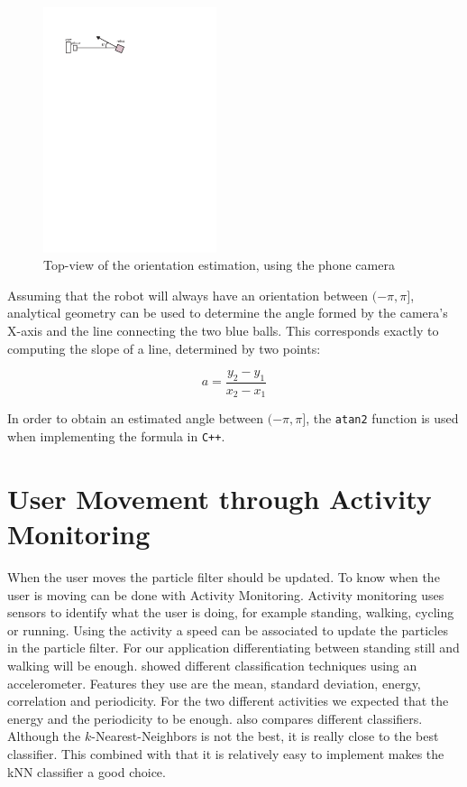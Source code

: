 \documentclass[journal]{IEEEtran}
\let\MYoriglatexcaption\caption
\renewcommand{\caption}[2][\relax]{\MYoriglatexcaption[#2]{#2}}
\begin{document}
\begin{figure}[!htpb]
\centering
\includegraphics[width=2in]{images/orientation_meas}
\caption{Top-view of the orientation estimation, using the phone camera}
\label{fig:orient_camera}
\end{figure}

Assuming that the robot will always have an orientation between $(-\pi, \pi]$, analytical geometry can be used to determine the angle formed by the camera's X-axis and the line connecting the two blue balls. This corresponds exactly to computing the slope of a line, determined by two points:

\begin{equation}
a=\frac{y_2-y_1}{x_2-x_1}
\end{equation}

In order to obtain an estimated angle between $(-\pi, \pi]$, the \texttt{atan2} function is used when implementing the formula in \texttt{C++}.

\section{User Movement through Activity Monitoring}

When the user moves the particle filter should be updated. To know when the
user is moving can be done with Activity Monitoring. Activity monitoring uses
sensors to identify what the user is doing, for example standing, walking,
cycling or running. Using the activity a speed can be associated to update the
particles in the particle filter. For our application differentiating between
standing still and walking will be enough. \cite{ravi2005activity} showed
different classification techniques using an accelerometer. Features they use
are the mean, standard deviation, energy, correlation and periodicity.  For the
two different activities we expected that the energy and the periodicity to
be enough. \cite{ravi2005activity} also compares different classifiers.
Although the $k$-Nearest-Neighbors is not the best, it is really close to the
best classifier. This combined with that it is relatively easy to implement
makes the kNN classifier a good choice.
\end{document}
